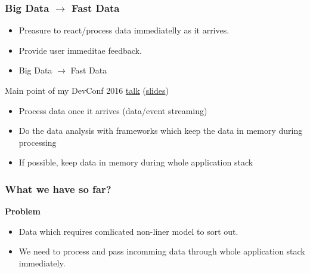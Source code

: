 \documentclass[10pt,utf8]{beamer}
\begin{document}
\begin{frame}
	\frametitle{Big Data $\rightarrow$ Fast Data}
	\begin{itemize}
		\item Preasure to react/process data immediatelly as it arrives.
		\pause
		\item Provide user immeditae feedback.
		\pause
		\item Big Data $\rightarrow$ Fast Data
	\end{itemize}

	\vspace{1cm}
	
	 {
		Main point of my DevConf 2016 \color{blue}\href{https://www.youtube.com/watch?v=98zYYs7c2wc}{talk}\color{black} (\color{blue}\href{https://github.com/vjuranek/presentations/blob/master/DevConf_Brno2016/devconf2016.pdf}{slides}\color{black})
		\begin{itemize}
			\pause
			\item Process data once it arrives (data/event streaming)
			\pause
			\item Do the data analysis with frameworks which keep the data in memory during processing
			\pause
			\item If possible, keep data in memory during whole application stack
		\end{itemize}
	}
\end{frame}

\begin{frame}
	\frametitle{What we have so far?}
	 {
		\centering
		\textbf{\Large{Problem}}
	}
	\vspace{0.5cm}
	\visible<3> {
		\begin{itemize}
			\item Data which requires comlicated non-liner model to sort out.
			\item We need to process and pass incomming data through whole application stack immediately.
		\end{itemize}
	}
\end{frame}
\end{document}
